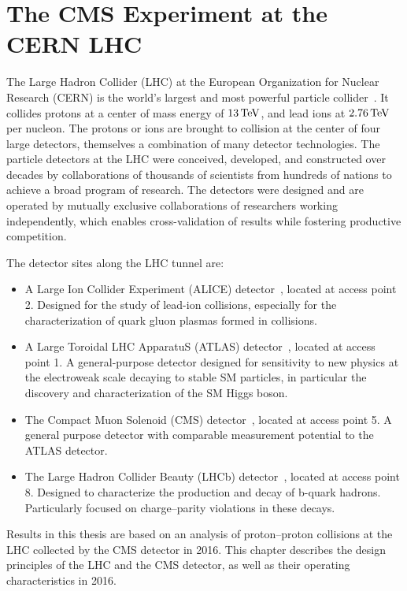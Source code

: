\chapter{The CMS Experiment at the CERN LHC}

The Large Hadron Collider (LHC) at the European Organization for Nuclear Research (CERN)
is the world's largest and most powerful particle collider~\cite{Evans:2008zzb}. It collides protons 
at a center of mass energy of $13\,\text{Te\hspace{-.08em}V}$, and lead ions at $2.76\,\text{Te\hspace{-.08em}V}$ per nucleon.
The protons or ions are brought to collision at the center of four large detectors,
themselves a combination of many detector technologies. 
The particle detectors at the LHC were conceived, developed, and constructed over decades
by collaborations of thousands of scientists from hundreds of nations to
achieve a broad program of research. The detectors were designed and are operated
by mutually exclusive collaborations of researchers working independently,
which enables cross-validation of results while fostering productive competition.

The detector sites along the LHC tunnel are:

\begin{itemize}
  \item A Large Ion Collider Experiment (ALICE) detector~\cite{Aamodt:2008zz}, located at access point 2.
  Designed for the study of lead-ion collisions, especially for the characterization
    of quark gluon plasmas formed in collisions.
  \item A Large Toroidal LHC ApparatuS (ATLAS) detector~\cite{Aad:2008zzm}, located at access point 1.
  A general-purpose detector designed for sensitivity to new physics at the electroweak scale
  decaying to stable SM particles, in particular the 
    discovery and characterization of the SM Higgs boson.
  \item The Compact Muon Solenoid (CMS) detector~\cite{Chatrchyan:2008aa}, located at access point 5.
    A general purpose detector with comparable measurement potential to the ATLAS detector.
  \item The Large Hadron Collider Beauty (LHCb) detector~\cite{Alves:2008zz}, located at access point 8.
  Designed to characterize the production and decay of b-quark hadrons. Particularly
    focused on charge--parity violations in these decays.
\end{itemize}

Results in this thesis are based on an analysis of proton--proton collisions at the LHC 
collected by the CMS detector in 2016. This chapter describes the design principles of the 
LHC and the CMS detector, as well as their operating characteristics in 2016.
  
